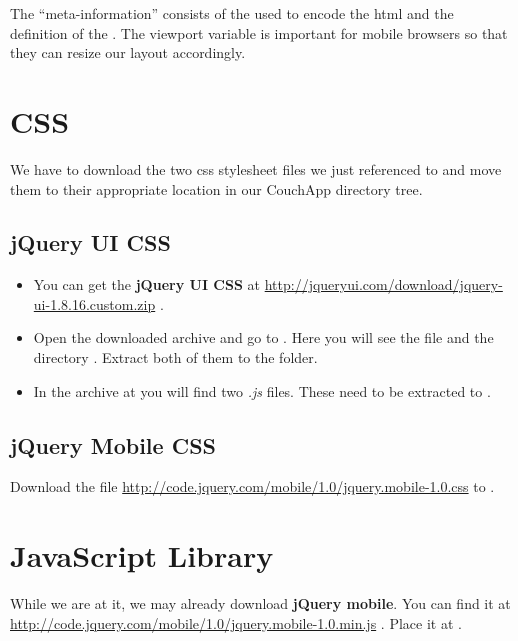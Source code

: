\documentclass[letterpaper,10pt,english]{sphinxmanual}
\begin{document}
The ``meta-information'' consists of the  used to encode the html and the definition of the . The viewport variable is important for mobile browsers so that they can resize our layout accordingly.


\section{CSS}
\label{3-Interface:css}
We have to download the two css stylesheet files we just referenced to and move them to their appropriate location in our CouchApp directory tree.


\subsection{jQuery UI CSS}
\label{3-Interface:jquery-ui-css}\begin{itemize}
\item {} 
You can get the \textbf{jQuery UI CSS} at \href{http://jqueryui.com/download/jquery-ui-1.8.16.custom.zip}{http://jqueryui.com/download/jquery-ui-1.8.16.custom.zip} .

\item {} 
Open the downloaded archive and go to . Here you will see the file  and the directory . Extract both of them to the  folder.

\item {} 
In the archive at  you will find two \emph{.js} files. These need to be extracted to .

\end{itemize}


\subsection{jQuery Mobile CSS}
\label{3-Interface:jquery-mobile-css}
Download the file \href{http://code.jquery.com/mobile/1.0/jquery.mobile-1.0.css}{http://code.jquery.com/mobile/1.0/jquery.mobile-1.0.css} to .


\section{JavaScript Library}
\label{3-Interface:javascript-library}
While we are at it, we may already download \textbf{jQuery mobile}. You can find it at \href{http://code.jquery.com/mobile/1.0/jquery.mobile-1.0.min.js}{http://code.jquery.com/mobile/1.0/jquery.mobile-1.0.min.js} .
Place it at .
\end{document}
